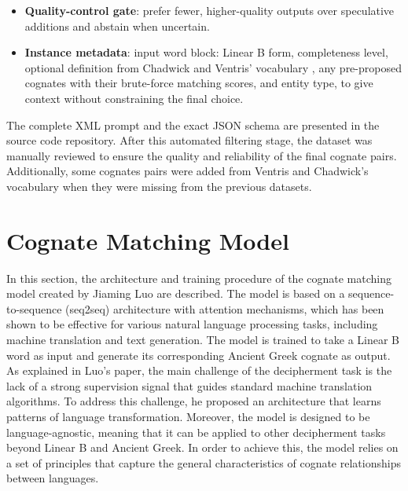 \begin{itemize}[leftmargin=2em]
  \item \textbf{Quality-control gate}: prefer fewer, higher-quality outputs over speculative additions and abstain when uncertain.
  \item \textbf{Instance metadata}: input word block: Linear B form, completeness level, optional definition from Chadwick and Ventris' vocabulary \cite{chadwick-notes}, any pre-proposed cognates with their brute-force matching scores, and entity type, to give context without constraining the final choice.
\end{itemize}

The complete XML prompt and the exact JSON schema are presented in the source code repository.
After this automated filtering stage, the dataset was manually reviewed to ensure the quality and reliability of the final cognate pairs.
Additionally, some cognates pairs were added from Ventris and Chadwick's vocabulary \cite{chadwick-notes} when they were missing from the previous datasets.

\section{Cognate Matching Model}
In this section, the architecture and training procedure of the cognate matching model created by Jiaming Luo \cite{luo} are described.
The model is based on a sequence-to-sequence (seq2seq) architecture with attention mechanisms, which has been shown to be effective for various natural language processing tasks, including machine translation and text generation.
The model is trained to take a Linear B word as input and generate its corresponding Ancient Greek cognate as output.
As explained in Luo's paper, the main challenge of the decipherment task is the lack of a strong supervision signal that guides standard machine translation algorithms.
To address this challenge, he proposed an architecture that learns patterns of language transformation.
Moreover, the model is designed to be language-agnostic, meaning that it can be applied to other decipherment tasks beyond Linear B and Ancient Greek.
In order to achieve this, the model relies on a set of principles that capture the general characteristics of cognate relationships between languages.

